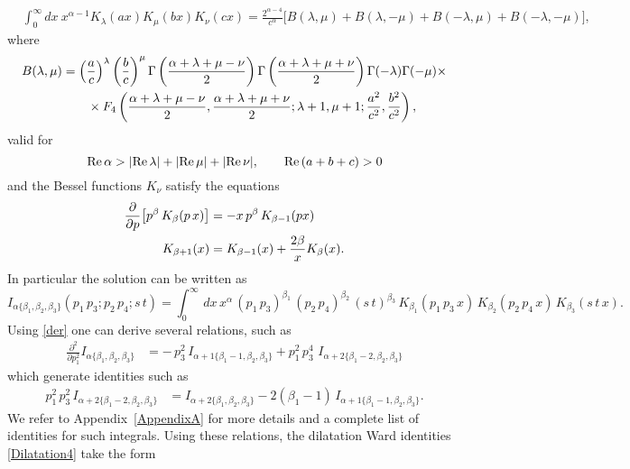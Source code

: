 \documentclass[a4paper,11pt,openright,twoside]{book}
\let\a=\alpha   \let\b=\beta   \let\g=\gamma   \let\d=\delta
\renewcommand{\Re}{\textrm{Re}}
\newcommand{\appref}[1]{Appendix~\ref{#1}}		%
\numberwithin{equation}{section}
\begin{document}
{\begin{align}
	& \int_0^\infty d x \: x^{\alpha - 1} K_\lambda(a x) K_\mu(b x) K_\nu(c x) =\frac{2^{\alpha - 4}}{c^\alpha} \bigg[ B(\lambda, \mu) + B(\lambda, -\mu) + B(-\lambda, \mu) + B(-\lambda, -\mu) \bigg], \label{3K}
\end{align}
where
\begin{align}
	B(\lambda, \mu) & = \left( \frac{a}{c} \right)^\lambda \left( \frac{b}{c} \right)^\mu \Gamma \left( \frac{\alpha + \lambda + \mu - \nu}{2} \right) \Gamma \left( \frac{\alpha + \lambda + \mu + \nu}{2} \right) \Gamma(-\lambda) \Gamma(-\mu) \times \notag\\
	& \qquad \times F_4 \left( \frac{\alpha + \lambda + \mu - \nu}{2}, \frac{\alpha + \lambda + \mu + \nu}{2}; \lambda + 1, \mu + 1; \frac{a^2}{c^2}, \frac{b^2}{c^2} \right), \label{3Kplus}
\end{align}
valid for
\begin{equation}
	\Re\, \alpha > | \Re\, \lambda | + | \Re \,\mu | + | \Re\,\nu |, \qquad \Re\,(a + b + c) > 0 \notag\\
\end{equation}
and the Bessel functions $K_\nu$ satisfy the equations 
\begin{align}
	\frac{\partial}{\partial p}\big[p^\b\,K_\b(p\,x)\big]&=-x\,p^\b\,K_{\b-1}(p x)\notag\\
	K_{\b+1}(x)&=K_{\b-1}(x)+\frac{2\b}{x}K_{\b}(x). \label{der}
\end{align}
In particular  the solution can be written as
\begin{equation}
	I_{\a\{\b_1,\b_2,\b_3\}}(p_1\,p_3; p_2\,p_4;s\,t)=\int_0^\infty\,dx\,x^\a\,(p_1\,p_3)^{\b_1}\,(p_2\,p_4)^{\b_2}\,(s\,t)^{\b_3}\,K_{\b_1}(p_1\,p_3\,x)\,K_{\b_2}(p_2\,p_4\,x)\,K_{\b_3}(s\,t\,x).\label{trekappa}
\end{equation}
Using  \eqref{der} one can derive several relations, 
such as 
\begin{align}
	\frac{\partial^2}{\partial p_1^2}I_{\a\{\b_1,\b_2,\b_3\}}&=-\,p_3^2\,I_{\a+1\{\b_1-1,\b_2,\b_3\}}+p_1^2\,p_3^4\,\,I_{\a+2\{\b_1-2,\b_2,\b_3\}}
\end{align}
which generate identities such as 
\begin{align}
	p_1^2\,p_3^2\,I_{\a+2\{\b_1-2,\b_2,\b_3\}}&=I_{\a+2\{\b_1,\b_2,\b_3\}}-2(\b_1-1)\,I_{\a+1\{\b_1-1,\b_2,\b_3\}}.
\end{align}
We refer to \appref{AppendixA} for more details and a complete list of identities for such integrals. Using these relations, the dilatation Ward identities \eqref{Dilatation4} take the form
}
\end{document}
